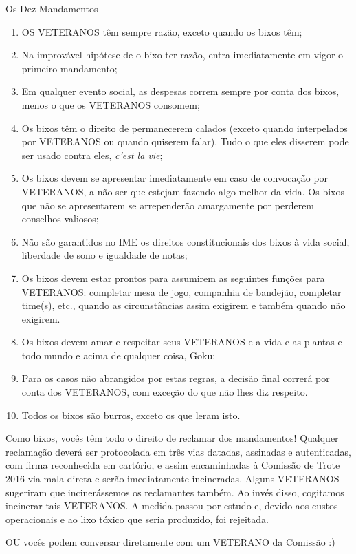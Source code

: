 \begin{editorial}{Os Dez Mandamentos}

\begin{enumerate}
  \item OS VETERANOS têm sempre razão, exceto quando os bixos têm;
  \item Na improvável hipótese de o bixo ter razão, entra imediatamente em vigor
        o primeiro mandamento; 
  \item Em qualquer evento social, as despesas correm sempre por conta dos
        bixos, menos o que os VETERANOS consomem; 
  \item Os bixos têm o direito de permanecerem calados (exceto quando
        interpelados por VETERANOS ou quando quiserem falar). Tudo o que eles
        disserem pode ser usado contra eles, \textit{c’est la vie};
  \item Os bixos devem se apresentar imediatamente em caso de convocação por
        VETERANOS, a não ser que estejam fazendo algo melhor da vida. Os bixos
        que não se apresentarem se arrependerão amargamente por perderem
        conselhos valiosos; %
  \item Não são garantidos no IME os direitos constitucionais dos bixos à vida
        social, liberdade de sono e igualdade de notas; 
  \item Os bixos devem estar prontos para assumirem as seguintes funções para
        VETERANOS: completar mesa de jogo, companhia de bandejão, completar
        time(s), etc., quando as circunstâncias assim exigirem e também quando
        não exigirem.
  \item Os bixos devem amar e respeitar seus VETERANOS e a vida e as plantas e
        todo mundo e acima de qualquer coisa, Goku;
  \item Para os casos não abrangidos por estas regras, a decisão final correrá
        por conta dos VETERANOS, com exceção do que não lhes diz respeito.
  \item Todos os bixos são burros, exceto os que leram isto. 
\end{enumerate} 

Como bixos, vocês têm todo o direito de reclamar dos mandamentos! Qualquer
reclamação deverá ser protocolada em três vias datadas, assinadas e
autenticadas, com firma reconhecida em cartório, e assim encaminhadas à
Comissão de Trote 2016 %
via mala direta e serão imediatamente incineradas. Alguns VETERANOS sugeriram
que incinerássemos os reclamantes também. Ao invés disso, cogitamos incinerar
tais VETERANOS. A medida passou por estudo e, devido aos custos operacionais e
ao lixo tóxico que seria produzido, foi rejeitada.

OU vocês podem conversar diretamente com um VETERANO da Comissão :)

\thispagestyle{empty}
\pagebreak
\end{editorial}

